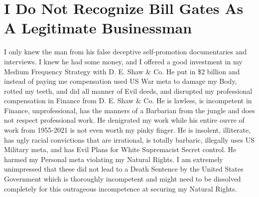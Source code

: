 \documentclass{amsart}
\begin{document}
\section{I Do Not Recognize Bill Gates As A Legitimate Businessman}

I only knew the man from his false deceptive self-promotion documentaries and interviews.  I knew he had some money, and I offered a good investment in my Medium Frequency Strategy with D. E. Shaw \& Co.  He put in \$2 billion and instead of paying me compensation used US War meta to damage my Body, rotted my teeth, and did all manner of Evil deeds, and disrupted my professional compensation in Finance from D. E. Shaw \& Co.  He is lawless, is incompetent in Finance, unprofessional, has the manners of a Barbarian from the jungle and does not respect professional work.  He denigrated my work while his entire ouvre of work from 1955-2021 is not even worth my pinky finger.  He is insolent, illiterate, has ugly racial convictions that are irrational, is totally barbaric, illegally uses US Military meta, and has Evil Plans for White Supremacist Secret control.  He harmed my Personal meta violating my Natural Rights.  I am extremely unimpressed that these did not lead to a Death Sentence by the United States Government which is thoroughly incompetent and might need to be dissolved completely for this outrageous incompetence at securing my Natural Rights.  
\end{document}

